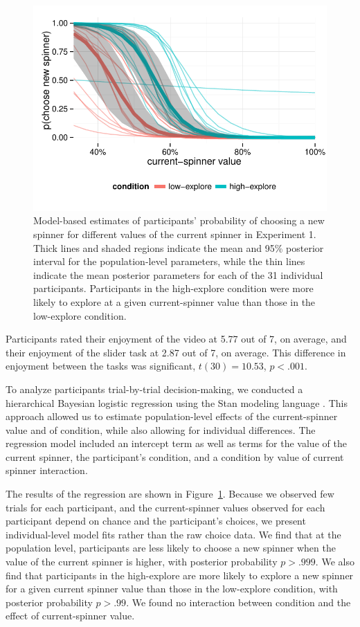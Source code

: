 \documentclass[10pt,letterpaper]{article}
\begin{document}
\begin{figure}
\centering
\includegraphics[width=\columnwidth]{figures/exp1results.pdf}
\caption{Model-based estimates of participants' probability of choosing a new
  spinner for different values of the current spinner in Experiment 1. Thick
  lines and shaded regions indicate the mean and 95\% posterior interval for the
  population-level parameters, while the thin lines indicate the mean posterior
  parameters for each of the 31 individual participants. Participants in the
  high-explore condition were more
  likely to explore at a given current-spinner value than those in the
  low-explore condition.}
\label{fig:exp1results}
\end{figure}

Participants rated their enjoyment of the video at 5.77 out of 7, on average,
and their enjoyment of the slider task at 2.87 out of 7, on average. This
difference in enjoyment between the tasks was significant, $t(30)=10.53$, $p<.001$.

To analyze participants trial-by-trial decision-making, we conducted a hierarchical
Bayesian logistic regression using the Stan modeling language \citep{stan-software:2015}.
This approach allowed us to estimate population-level effects of the
current-spinner value and of condition, while also allowing for individual
differences. The regression model included an intercept term as well as terms
for the value of the current spinner, the participant's condition, and a
condition by value of current spinner interaction.

The results of the regression are shown in Figure~\ref{fig:exp1results}.
Because we observed few trials for each participant, and the current-spinner
values observed for each participant depend on chance and the participant's
choices, we present individual-level model fits rather than the raw choice data.
We find that at the population level, participants are less likely to choose a
new spinner when the value of the current spinner is higher, with posterior
probability $p>.999$. We also find that participants in the high-explore are more likely to explore a new spinner for a
given current spinner value than those in the low-explore condition, with
posterior probability $p>.99$. We found no interaction between condition and the
effect of current-spinner value.
\end{document}
